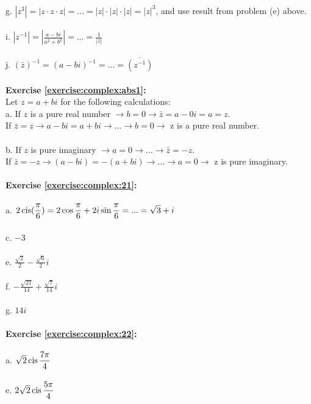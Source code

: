 \\
g. $\left|z^{3}\right|=\left|z\cdot z \cdot z\right|=...=\left|z\right|\cdot\left|z\right|\cdot\left|z\right|=\left|z\right|^{3}$, and use result from problem (e) above.\\
\\
i. $\left|z^{-1}\right|=\left|\displaystyle\frac{a-bi}{a^{2}+b^{2}}\right|=...=\displaystyle\frac{1}{\left|z\right|}$\\
\\
j. $(\bar{z})^{-1}=(a-bi)^{-1}=...=\overline{(z^{-1})}$\\
\\
\textbf{Exercise \ref{exercise:complex:abs1}:}\\
Let $z=a+bi$ for the following calculations:\\
a. If $z$ is a pure real number $\rightarrow b=0 \rightarrow \bar{z}=a-0i=a=z$.\\
If $\bar{z}=z \rightarrow a-bi=a+bi \rightarrow ... \rightarrow b=0 \rightarrow $ z is a pure real number.\\
\\
b. If $z$ is pure imaginary $\rightarrow a=0 \rightarrow ... \rightarrow \bar{z}=-z$.\\
If $\bar{z}=-z \rightarrow (a-bi)=-(a+bi) \rightarrow ... \rightarrow a=0 \rightarrow $ z is pure imaginary.\\
\\
\textbf{Exercise \ref{exercise:complex:21}:}\\
\\
a. $2\operatorname{cis}(\displaystyle\frac{\pi}{6})=2\cos\frac{\pi}{6}+2i\sin\frac{\pi}{6}=...=\sqrt{3}+i$\\
\\
c. $-3$\\
\\
e. $\displaystyle\frac{\sqrt{2}}{2}-\frac{\sqrt{6}}{2}i$\\
\\
f. $-\displaystyle\frac{\sqrt{21}}{14}+\frac{\sqrt{7}}{14}i$\\
\\
g. $14i$\\
\\
\textbf{Exercise \ref{exercise:complex:22}:}\\
\\
a. $\sqrt{2}\operatorname{cis}\displaystyle\frac{7\pi}{4}$\\
\\
e. $2\sqrt{2}\operatorname{cis}\displaystyle\frac{5\pi}{4}$\\
\\
